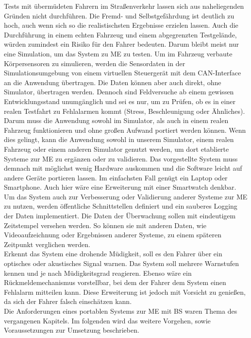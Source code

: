 {Tests mit übermüdeten Fahrern im Straßenverkehr lassen sich aus naheliegenden Gründen nicht durchführen. Die Fremd- und Selbstgefährdung ist deutlich zu hoch, auch wenn sich so die realistischsten Ergebnisse erzielen lassen. Auch die Durchführung in einem echten Fahrzeug und einem abgegrenzten Testgelände, würden zumindest ein Risiko für den Fahrer bedeuten. Darum bleibt meist nur eine Simulation, um das System zu \acl{ME} zu testen. Um im Fahrzeug verbaute Körpersensoren zu simulieren, werden die Sensordaten in der Simulationsumgebung von einem virtuellen Steuergerät mit dem CAN-Interface an die Anwendung übertragen. Die Daten können aber auch direkt, ohne Simulator, übertragen werden. 
Dennoch sind Feldversuche ab einem gewissen Entwicklungsstand unumgänglich und sei es nur, um zu Prüfen, ob es in einer realen Testfahrt zu Fehlalarmen kommt (Stress, Beschleunigung oder Ähnliches). Darum muss die Anwendung sowohl im Simulator, als auch in einem realen Fahrzeug funktionieren und ohne großen Aufwand portiert werden können. Wenn dies gelingt, kann die Anwendung sowohl in unserem Simulator, einem realen Fahrzeug oder einem anderen Simulator genutzt werden, um dort etablierte Systeme zur \acl{ME} zu ergänzen oder zu validieren.
Das vorgestellte System muss demnach mit möglichst wenig Hardware auskommen und die Software leicht auf andere Geräte portieren lassen. Im einfachsten Fall genügt ein Laptop oder Smartphone. Auch hier wäre eine Erweiterung mit  einer Smartwatch denkbar.\\

Um das System auch zur Verbesserung oder Validierung anderer Systeme zur \acl{ME} zu nutzen, werden öffentliche Schnittstellen definiert und ein sauberes Logging der Daten implementiert. Die Daten der Überwachung sollen mit eindeutigem Zeitstempel versehen werden. So können sie mit anderen Daten, wie Videoaufzeichnung oder Ergebnissen anderer Systeme, zu einem späteren Zeitpunkt verglichen werden. \\

Erkennt das System eine drohende Müdigkeit, soll es den Fahrer über ein optisches oder akustisches Signal warnen. Das System soll mehrere Warnstufen kennen und je nach Müdigkeitsgrad reagieren. Ebenso wäre ein Rückmeldemechanismus vorstellbar, bei dem der Fahrer dem System einen Fehlalarm mitteilen kann. Diese Erweiterung ist jedoch mit Vorsicht zu genießen, da sich der Fahrer falsch einschätzen kann. \\

Die Anforderungen eines portablen Systems zur \acl{ME} mit \acl{BS} waren Thema des vergangenen Kapitels. Im folgenden wird das weitere Vorgehen, sowie Voraussetzungen zur Umsetzung beschrieben.

}
